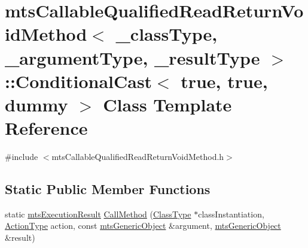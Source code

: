 \hypertarget{classmts_callable_qualified_read_return_void_method_1_1_conditional_cast_3_01true_00_01true_00_01dummy_01_4}{\section{mts\-Callable\-Qualified\-Read\-Return\-Void\-Method$<$ \-\_\-class\-Type, \-\_\-argument\-Type, \-\_\-result\-Type $>$\-:\-:Conditional\-Cast$<$ true, true, dummy $>$ Class Template Reference}
\label{classmts_callable_qualified_read_return_void_method_1_1_conditional_cast_3_01true_00_01true_00_01dummy_01_4}
}


{\ttfamily \#include $<$mts\-Callable\-Qualified\-Read\-Return\-Void\-Method.\-h$>$}

\subsection*{Static Public Member Functions}
\begin{DoxyCompactItemize}
\item 
static \hyperlink{classmts_execution_result}{mts\-Execution\-Result} \hyperlink{classmts_callable_qualified_read_return_void_method_1_1_conditional_cast_3_01true_00_01true_00_01dummy_01_4_a62882dd067f4bff81aa255550358e445}{Call\-Method} (\hyperlink{classmts_callable_qualified_read_return_void_method_ae99cfab8208eb374f2cdf01c97edfa3b}{Class\-Type} $\ast$class\-Instantiation, \hyperlink{classmts_callable_qualified_read_return_void_method_a7ac7450d5dce9ad80db720a370118211}{Action\-Type} action, const \hyperlink{classmts_generic_object}{mts\-Generic\-Object} \&argument, \hyperlink{classmts_generic_object}{mts\-Generic\-Object} \&result)
\end{DoxyCompactItemize}


